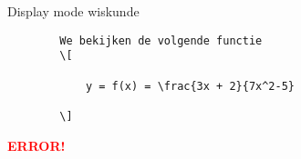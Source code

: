 \begin{frame}[fragile]{Display mode wiskunde}
    
    \begin{verbatim}
        We bekijken de volgende functie
        \[

            y = f(x) = \frac{3x + 2}{7x^2-5}

        \]
    \end{verbatim}
    
\begin{tcolorbox}[width=11cm, size=small]
    \textbf{\textcolor{red}{ERROR!}}
\end{tcolorbox}
\end{frame}
